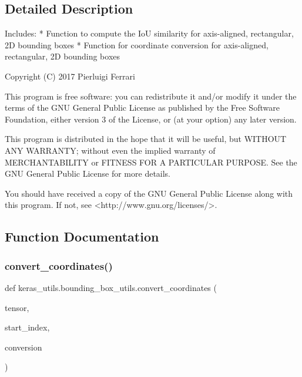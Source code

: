 \subsection{Detailed Description}
\begin{DoxyVerb}Includes:
* Function to compute the IoU similarity for axis-aligned, rectangular, 2D bounding boxes
* Function for coordinate conversion for axis-aligned, rectangular, 2D bounding boxes

Copyright (C) 2017 Pierluigi Ferrari

This program is free software: you can redistribute it and/or modify
it under the terms of the GNU General Public License as published by
the Free Software Foundation, either version 3 of the License, or
(at your option) any later version.

This program is distributed in the hope that it will be useful,
but WITHOUT ANY WARRANTY; without even the implied warranty of
MERCHANTABILITY or FITNESS FOR A PARTICULAR PURPOSE.  See the
GNU General Public License for more details.

You should have received a copy of the GNU General Public License
along with this program.  If not, see <http://www.gnu.org/licenses/>.
\end{DoxyVerb}
 

\subsection{Function Documentation}
\mbox{\label{namespacekeras__utils_1_1bounding__box__utils_a7b2a9d86d4acfcddcec55133486f2012}} 
\subsubsection{\texorpdfstring{convert\+\_\+coordinates()}{convert\_coordinates()}}
{\footnotesize\ttfamily def keras\+\_\+utils.\+bounding\+\_\+box\+\_\+utils.\+convert\+\_\+coordinates (\begin{DoxyParamCaption}\item[{}]{tensor,  }\item[{}]{start\+\_\+index,  }\item[{}]{conversion }\end{DoxyParamCaption})}

